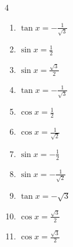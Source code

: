 \begin{multicols}{4}
\begin{enumerate}

  \item $\displaystyle \tan{x}  = -\frac{1}{\sqrt{3}}$


  \item $\displaystyle \sin{x}  = \frac{1}{2}$


  \item $\displaystyle \sin{x}  = \frac{\sqrt{3}}{2}$


  \item $\displaystyle \tan{x}  = -\frac{1}{\sqrt{3}}$


  \item $\displaystyle \cos{x}  = \frac{1}{2}$


  \item $\displaystyle \cos{x}  = \frac{1}{\sqrt{2}}$


  \item $\displaystyle \sin{x}  = -\frac{1}{2}$


  \item $\displaystyle \sin{x}  = -\frac{1}{\sqrt{2}}$


\columnbreak %

  \item $\displaystyle \tan{x}  = -\sqrt{3}$


  \item $\displaystyle \cos{x}  = \frac{\sqrt{3}}{2}$


  \item $\displaystyle \cos{x}  = \frac{\sqrt{3}}{2}$


\end{enumerate}
\end{multicols}
